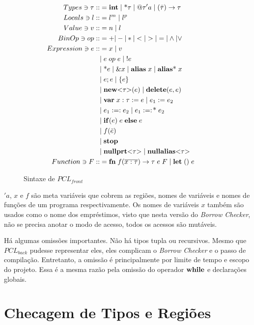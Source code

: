 \begin{figure}[ht]
	\caption{Sintaxe de $PCL_{front}$}
	\label{fig:pcl-front:sintax}
	\begin{align*}
		Types \ni \tau ::&= \mathbf{int} \;|\; \text{*}\tau \;|\; @\tau'a \;|\; (\bar\tau) \to \tau \\
		Locals \ni l ::&= l^m \;|\; l^p &&\\ 
		Value \ni v ::&= n \;|\; l && \\
		BinOp \ni op ::&= + | - | * | < | > | = | \land | \lor \\
		Expression \ni e ::&= x \;|\; v \\
		&|\; e\; op\; e \;|\; !e  \\
		&|\; \text{*}e \;|\; \&x \;|\; \mathbf{alias} \; x \;|\; \mathbf{alias}\text{*} \; x\\
		&|\; e;e \;|\; \{e\} \\ 
		&|\; \mathbf{new}\text{<}\tau\text{>}(e) \;|\; \mathbf{delete}(e, e) \; \\ 
		&|\; \mathbf{var}\; x: \tau := e \;|\; e_1 := e_2 \\
		&|\; e_1 :=: e_2 \;|\; e_1 :=:\!\text{*}\;e_2\\
		&|\; \mathbf{if}(e) \; e \; \mathbf{else} \; e\\
		&|\; f(\bar e) \\ 
		&|\; \mathbf{stop}\\ 
		&|\; \mathbf{nullprt}\text{<}\tau\text{>} \;|\; \mathbf{nullalias}\text{<}\tau\text{>}\\ 
		Function \ni F ::&= \mathbf{fn} \; f(\overline{x : \tau}) \to \tau \; e \; F \; | \; \mathbf{let}\;() \; e \\
	\end{align*}
\end{figure}

\noindent$'a$, $x$ e $f$ são meta variáveis que cobrem as regiões, nomes de variáveis e nomes de funções de um programa respectivamente. Os nomes de variáveis $x$ também são usados como o nome dos empréstimos, visto que nesta versão do \emph{Borrow Checker}, não se precisa anotar o modo de acesso, todos os acessos são mutáveis.
 
Há algumas omissões importantes. Não há tipos tupla ou recursivos. Mesmo que $PCL_{back}$ pudesse representar eles, eles complicam o \emph{Borrow Checker} e o passo de compilação. Entretanto, a omissão é principalmente por limite de tempo e escopo do projeto. Essa é a mesma razão pela omissão do operador $\mathbf{while}$ e declarações globais.

\section{Checagem de Tipos e Regiões}

